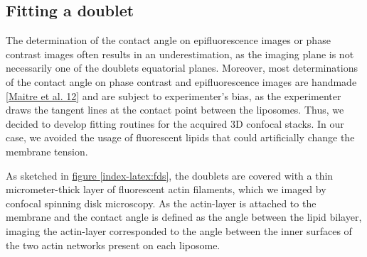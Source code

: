 \documentclass[A4paperpaper,11pt,english]{sphinxmanual}
\begin{document}
\subsection{Fitting a doublet}
\label{index-latex:fitting-a-doublet}
The determination of the contact angle on epifluorescence images or phase contrast
images often results in an underestimation, as the imaging plane is not necessarily one of the doublets
equatorial planes. Moreover, most determinations of the contact angle on phase
contrast and epifluorescence images are handmade {\hyperref[index-latex:maitre2012]{{[}Maitre et al. 12{]}}} and
are subject to experimenter’s bias, as the experimenter draws the tangent lines at the
contact point between the liposomes. Thus, we decided to develop fitting routines for the acquired
3D confocal stacks. In our case, we avoided the usage of
fluorescent lipids that could artificially change the membrane tension.

As sketched in \hyperref[index-latex:fds]{figure  \ref*{index-latex:fds}}, the doublets are covered with a
thin micrometer-thick layer of fluorescent actin filaments, which we
imaged by confocal spinning disk microscopy. As the actin-layer is attached to the membrane
and the contact angle is defined as the angle between the lipid bilayer, imaging the actin-layer corresponded
to the angle between the inner surfaces of the two actin networks present on each liposome.
\end{document}
